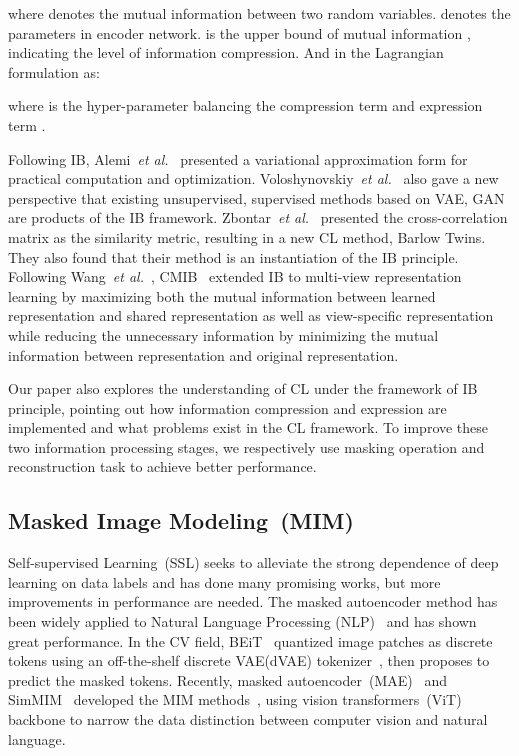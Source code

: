 \documentclass[10pt,twocolumn,letterpaper]{article}
\begin{document}
where  denotes the mutual information between two random variables.  denotes the parameters in encoder network.  is the upper bound of mutual information , indicating the level of information compression. And in the Lagrangian formulation as:

where  is the hyper-parameter balancing the compression term  and expression term .

Following IB, Alemi~\textit{et al.}~\cite{alemi2017vib} presented a variational approximation form for practical computation and optimization. Voloshynovskiy~\textit{et al.}~\cite{voloshynovskiy2020variational} also gave a new perspective that existing unsupervised, supervised methods based on VAE, GAN are products of the IB framework. Zbontar~\textit{et al.}~\cite{zbontar2021barlow} presented the cross-correlation matrix as the similarity metric, resulting in a new CL method, Barlow Twins. They also found that their method is an instantiation of the IB principle. Following Wang~\textit{et al.}~\cite{wang2019deep}, CMIB~\cite{wan2021multi} extended IB to multi-view representation learning by maximizing both the mutual information between learned representation and shared representation as well as view-specific representation while reducing the unnecessary information by minimizing the mutual information between representation and original representation.

Our paper also explores the understanding of CL under the framework of IB principle, pointing out how information compression and expression are implemented and what problems exist in the CL framework. To improve these two information processing stages, we respectively use masking operation and reconstruction task to achieve better performance.

\subsection{Masked Image Modeling~(MIM)}
Self-supervised Learning~(SSL) seeks to alleviate the strong dependence of deep learning on data labels and has done many promising works, but more improvements in performance are needed. The masked autoencoder method has been widely applied to Natural Language Processing (NLP)~\cite{devlin2018bert,brown2020language} and has shown great performance. In the CV field, BEiT~\cite{bao2021beit} quantized image patches as discrete tokens using an off-the-shelf discrete VAE(dVAE) tokenizer~\cite{ramesh2021zero}, then proposes to predict the masked tokens. Recently, masked autoencoder~(MAE)~\cite{he2022masked} and SimMIM~\cite{xie2022simmim} developed the MIM methods~\cite{wei2022masked,bao2021beit,zhou2021ibot}, using vision transformers~(ViT)~\cite{dosovitskiy2020image} backbone to narrow the data distinction between computer vision and natural language. 
\end{document}
